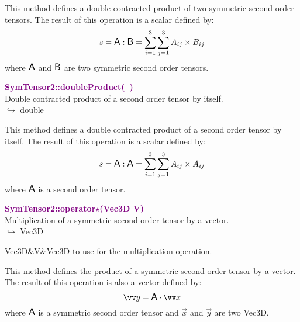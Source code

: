 This method defines a double contracted product of two symmetric second order tensors.
The result of this operation is a scalar defined by:
\begin{equation*}
s = \mbox{\large\ensuremath{\mathsf{A}}} : \mbox{\large\ensuremath{\mathsf{B}}} = \sum_{i=1}^{3} \sum_{j=1}^{3} A_{ij}\times B_{ij}
\end{equation*}
where $\mbox{\large\ensuremath{\mathsf{A}}}$ and $\mbox{\large\ensuremath{\mathsf{B}}}$ are two symmetric second order tensors.

\textcolor{purple}{\textbf{SymTensor2::doubleProduct(~)}}\label{SymTensor2::doubleProduct()}\\
Double contracted product of a second order tensor by itself.\\ \hspace*{10mm}$\hookrightarrow$ double

This method defines a double contracted product of a second order tensor by itself.
The result of this operation is a scalar defined by:
\begin{equation*}
s = \mbox{\large\ensuremath{\mathsf{A}}} : \mbox{\large\ensuremath{\mathsf{A}}} = \sum_{i=1}^{3} \sum_{j=1}^{3} A_{ij}\times A_{ij}
\end{equation*}
where $\mbox{\large\ensuremath{\mathsf{A}}}$ is a second order tensor.

\textcolor{purple}{\textbf{SymTensor2::operator$\star$(Vec3D V)}}\label{SymTensor2::operator*(Vec3D V)}\\
Multiplication of a symmetric second order tensor by a vector.\\ \hspace*{10mm}$\hookrightarrow$ Vec3D

\begin{tcolorbox}[width=\textwidth,myArgs,tabularx={ll|R}]
Vec3D&V&Vec3D to use for the multiplication operation.
\end{tcolorbox}

This method defines the product of a symmetric second order tensor by a vector.
The result of this operation is also a vector defined by:
\begin{equation*}
\overrightarrow{y} = \A \cdot \overrightarrow{x}
\end{equation*}
where $\mbox{\large\ensuremath{\mathsf{A}}}$ is a symmetric second order tensor and $\overrightarrow{x}$ and $\overrightarrow{y}$ are two Vec3D.


